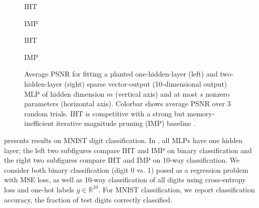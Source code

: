 \documentclass{article} %
\newcommand{\measurement}{y}
\newcommand{\1}{\ensuremath{{\sf (i)}}}
\newcommand{\2}{\ensuremath{{\sf (ii)}}}
\newcommand{\3}{\ensuremath{{\sf (iii)}}}
\newcommand{\4}{\ensuremath{{\sf (iv)}}}
\newcommand{\5}{\ensuremath{{\sf (v)}}}
\newcommand{\6}{\ensuremath{{\sf (vi)}}}
\newcommand{\R}{\mathbb{R}}
\begin{document}
\begin{figure}[ht]
    \centering
    \begin{minipage}{0.24\textwidth}
    \centering
    IHT
    \end{minipage}
    \begin{minipage}{0.24\textwidth}
    \centering
        IMP
    \end{minipage}
    \centering
    \begin{minipage}{0.24\textwidth}
    \centering
    IHT
    \end{minipage}
    \begin{minipage}{0.24\textwidth}
    \centering
        IMP
    \end{minipage}
    \caption{Average PSNR for fitting a planted one-hidden-layer (left) and two-hidden-layer (right) sparse vector-output (10-dimensional output) MLP of hidden dimension $m$ (vertical axis) and at most $s$ nonzero parameters (horizontal axis). Colorbar shows average PSNR over 3 random trials. IHT is competitive with a strong but memory-inefficient iterative magnitude pruning (IMP) baseline \citep{frankle2018lottery}.}
    \label{fig:planted_vectoroutput}
\end{figure}





 presents results on MNIST digit classification. In , all MLPs have one hidden layer; the left two subfigures compare IHT and IMP on binary classification and the right two subfigures compare IHT and IMP on 10-way classification.
We consider both binary classification (digit 0 vs. 1) posed as a regression problem with MSE loss, as well as 10-way classification of all digits using cross-entropy loss and one-hot labels $\measurement \in \R^{10}$. For MNIST classification, we report classification accuracy, the fraction of test digits correctly classified.
\end{document}
